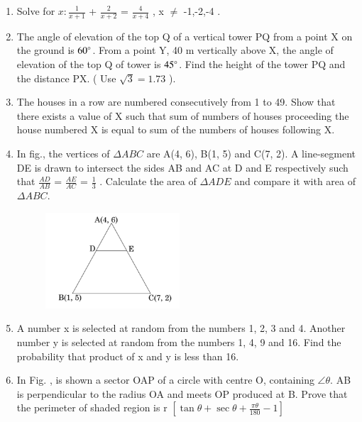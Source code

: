 \documentclass[journal,12pt,twocolumn]{IEEEtran}
\begin{document}
\begin{enumerate}
\item  Solve for $ x :  \frac{1}{x+1} $ + $ \frac{2}{x+2} $ = $ \frac{4}{x+4} $ , x $\neq$ -1,-2,-4 . \\

\item The angle of elevation of the top Q of a vertical tower PQ from a point X on the ground is $ 60\degree $. From a point Y, 40 m vertically above X, the angle of elevation of the top Q of tower is $ 45 \degree $. Find the height of the tower PQ and the distance PX. ( Use $ \sqrt{3} = 1.73 $ ).\\
 
\item The houses in a row are numbered consecutively from 1 to 49. Show that there exists a value of X such that sum of numbers of houses proceeding the house numbered X is equal to sum of the numbers of houses following X.\\

\item In fig., the vertices of \( \Delta ABC \) are A(4, 6), B(1, 5) and C(7, 2). A line-segment DE is drawn to intersect the sides AB and AC at D and E respectively such that $\frac{AD}{AB}$ = $\frac{AE}{AC}$ = $\frac{1}{3}$ . Calculate the area of \( \Delta ADE \) and compare it with area of \( \Delta ABC \).\\
	\begin{figure}[H]
      \centering
      \includegraphics[width=5cm]{8.png}
      \label{fig:my_label}
\end{figure} 

\item A number x is selected at random from the numbers 1, 2, 3 and 4. Another number y is selected at random from the numbers 1, 4, 9 and 16. Find the probability that product of x and y is less than 16.\\

\item In Fig. , is shown a sector OAP of a circle with centre O, containing $\angle \theta$. AB is perpendicular to the radius OA and meets OP produced at B. Prove that the perimeter of shaded region is r $\left[\tan \theta + \sec \theta + \frac{\pi \theta}{180}-1 \right] $ \\


\end{enumerate}
\end{document}
